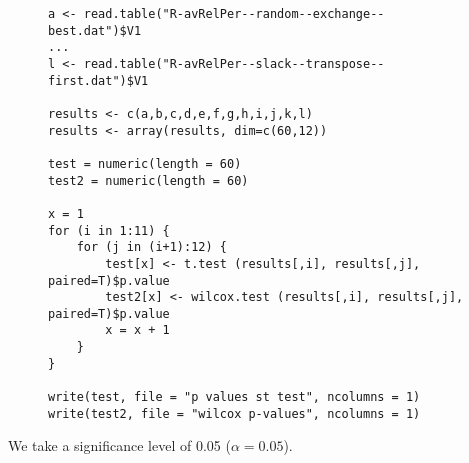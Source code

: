 \begin{figure}[H]
\begin{lstlisting}
a <- read.table("R-avRelPer--random--exchange--best.dat")$V1
...
l <- read.table("R-avRelPer--slack--transpose--first.dat")$V1

results <- c(a,b,c,d,e,f,g,h,i,j,k,l)
results <- array(results, dim=c(60,12))

test = numeric(length = 60)
test2 = numeric(length = 60)

x = 1
for (i in 1:11) {
	for (j in (i+1):12) {
		test[x] <- t.test (results[,i], results[,j], paired=T)$p.value
		test2[x] <- wilcox.test (results[,i], results[,j], paired=T)$p.value
		x = x + 1
	}
}

write(test, file = "p values st test", ncolumns = 1)
write(test2, file = "wilcox p-values", ncolumns = 1)
\end{lstlisting}
\end{figure}

We take a significance level of 0.05 ($\alpha = 0.05$).


